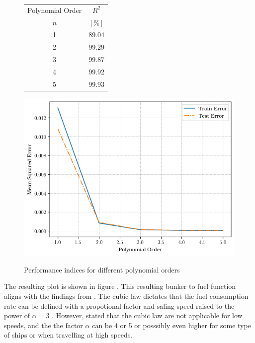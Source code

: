 \begin{figure}
    \begin{minipage}{0.35\linewidth} %
      \footnotesize
      \centering
      \begin{tabular}{c c}
          \hline
          Polynomial Order & $R^2$ \\
          $n$&$[\%]$\\
          \hline
            1 & 89.04\\
            2 & 99.29\\
            3 & 99.87\\
            4 & 99.92\\
            5 & 99.93\\
          \hline
      \end{tabular}
      \label{tbl:polyfit_best_rsquared}
    \end{minipage}
    \hspace{0.01\linewidth}
    \begin{minipage}{0.6\linewidth} %
        \centering
        \includegraphics[width=\linewidth]{02_figures/MSE_polyfitplot.png}
        \label{fig:polyfit_best_MSE}
        \end{minipage}
  \caption{Performance indices for different polynomial orders}
  \end{figure}

The resulting plot is shown in figure , This resulting bunker to fuel function aligns with the findings from . The cubic law dictates that the fuel consumption rate can be defined with a propotional factor and saling speed raised to the power of $\alpha = 3$ . However,  stated that the cubic law are not applicable for low speeds, and the the factor $\alpha$ can be 4 or 5 or posssibly even higher for some type of ships or when travelling at high speeds.\\ 

